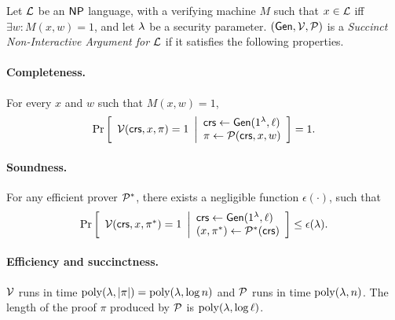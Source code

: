 \begin{definition} \label{def:snarg}
Let $\mathcal{L}$ be an ${\mathsf{NP}}$ language, with a verifying machine $M$
such that $x \in \mathcal{L}$ iff $\exists w: M(x,w)=1$, and let $\lambda$ be a security parameter. $(\mathsf{Gen}, \mathcal{V}, \mathcal{P})$ is a \emph{Succinct Non-Interactive Argument for $\mathcal{L}$}
if it satisfies the following properties.
\vspace{-1ex}
\paragraph{Completeness.} For every $x$ and $w$ such that $M(x,w)=1$,
    \begin{gather*}
        \underset{}{\text{Pr}}\left [ 
        \begin{array}{ll}
        \mathcal{V}(\mathsf{crs}, x, \pi) = 1
        \end{array}
        \middle\vert
        \begin{array}{ll}
        \mathit{ \mathsf{crs} } \leftarrow \mathsf{Gen}(1^\lambda, \ell) \\
        \pi \leftarrow \mathcal{P}(\mathit{ \mathsf{crs} }, x, w) \\
        \end{array}
        \right ] = 1
	.
    \end{gather*}
\vspace{-1ex}
\paragraph{Soundness.} For any efficient prover $\mathcal{P}^*$, there exists a negligible function $\epsilon(\cdot)$, such that \begin{gather*}
        \underset{}{\text{Pr}}\left [
        \begin{array}{ll}
        \mathcal{V}(\mathit{ \mathsf{crs} }, x, \pi^*) = 1
        \end{array}
        \middle\vert
        \begin{array}{ll}
        \mathit{ \mathsf{crs} } \leftarrow \mathsf{Gen}(1^\lambda, \ell) \\
        (x, \pi^*) \leftarrow \mathcal{P}^*(\mathit{ \mathsf{crs} }) \\
        \end{array}
        \right ] \leq \epsilon(\lambda)
	.
    \end{gather*}
\vspace{-1ex}
    \paragraph{Efficiency and succinctness.} $\mathcal{V}$ runs in time $\operatorname{poly}(\lambda, |\pi|) = \operatorname{poly}(\lambda, \log n)$
    and $\mathcal{P}$ runs in time $\operatorname{poly}(\lambda, n)$.
	The length of the proof $\pi$ produced by $\mathcal{P}$ is $\operatorname{poly}(\lambda, \log \ell)$.

\end{definition}
